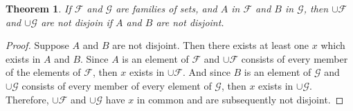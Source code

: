 
\newtheorem{theorem}{Theorem}

\begin{theorem}
  If $\mathscr{F}$ and $\mathscr{G}$ are families of sets, and $A$ in
  $\mathscr{F}$ and $B$ in $\mathscr{G}$, then $\cup\mathscr{F}$ and
  $\cup\mathscr{G}$ are not disjoin if $A$ and $B$ are not disjoint.
\end{theorem}

\begin{proof}
  Suppose $A$ and $B$ are not disjoint. Then there exists at least one $x$
  which exists in $A$ and $B$. Since $A$ is an element of $\mathscr{F}$ and
  $\cup\mathscr{F}$ consists of every member of the elements of $\mathscr{F}$,
  then $x$ exists in $\cup\mathscr{F}$. And since $B$ is an element of
  $\mathscr{G}$ and $\cup\mathscr{G}$ consists of every member of every
  element of $\mathscr{G}$, then $x$ exists in $\cup\mathscr{G}$. Therefore,
  $\cup\mathscr{F}$ and $\cup\mathscr{G}$ have $x$ in common and are
  subsequently not disjoint.
\end{proof}
